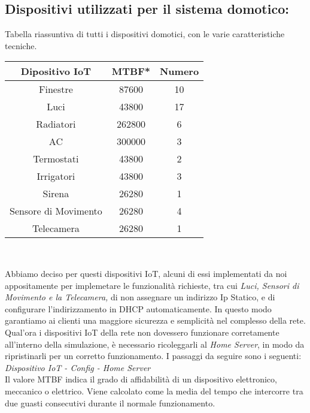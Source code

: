 \documentclass[italian, 12pt, a4paper]{article}
\begin{document}
\subsection{Dispositivi utilizzati per il sistema domotico:}\label{sec:domotico}
Tabella riassuntiva di tutti i dispositivi domotici, con le varie caratteristiche tecniche.
\begin{center}
    \renewcommand{\arraystretch}{1.5} %
    \begin{tabular}{|c|c|c|}
        \hline
        \rowcolor{violet!30}
        Dipositivo IoT & MTBF* & Numero\\
        \hline
        Finestre & 87600 & 10\\
        \hline
        Luci & 43800 & 17\\
        \hline
        Radiatori & 262800 & 6\\
        \hline
        AC & 300000 & 3\\
        \hline
        Termostati & 43800 & 2\\
        \hline
        Irrigatori & 43800 & 3\\
        \hline
        Sirena & 26280 & 1\\
        \hline
        Sensore di Movimento & 26280 & 4\\
        \hline
        Telecamera & 26280 & 1\\
        \hline
    \end{tabular}\\[4mm]
\end{center}
\vspace{1cm}
Abbiamo deciso per questi dispositivi IoT, alcuni di essi implementati da noi appositamente per implemetare le funzionalità richieste, tra cui \emph{Luci, Sensori di Movimento e la Telecamera,} di non assegnare un indirizzo Ip Statico, e di configurare l'indirizzamento in DHCP automaticamente. In questo modo garantiamo ai clienti una maggiore sicurezza e semplicità nel complesso della rete.\\
Qual'ora i dispositivi IoT della rete non dovessero funzionare corretamente all'interno della simulazione, è necessario ricoleggarli al \emph{Home Server}, in modo da ripristinarli per un corretto funzionamento. I passaggi da seguire sono i seguenti: \\ \emph{Dispositivo IoT - Config - Home Server} \\
Il valore MTBF indica il grado di affidabilità di un dispositivo elettronico, meccanico o elettrico. Viene calcolato come la media del tempo che intercorre tra due guasti consecutivi durante il normale funzionamento.
\clearpage
\end{document}
